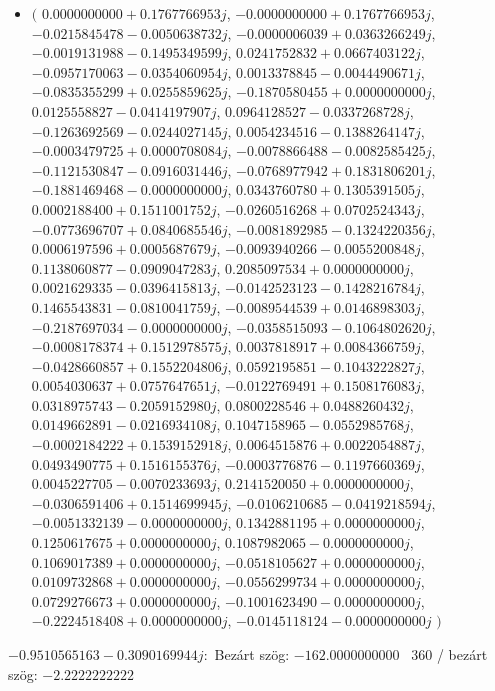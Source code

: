 \documentclass[14pt,a4paper]{article}
\begin{document}
\begin{itemize}
\item
$\big($
$0.0000000000+0.1767766953j$, $-0.0000000000+0.1767766953j$, $-0.0215845478-0.0050638732j$, $-0.0000006039+0.0363266249j$, $-0.0019131988-0.1495349599j$, $0.0241752832+0.0667403122j$, $-0.0957170063-0.0354060954j$, $0.0013378845-0.0044490671j$, $-0.0835355299+0.0255859625j$, $-0.1870580455+0.0000000000j$, $0.0125558827-0.0414197907j$, $0.0964128527-0.0337268728j$, $-0.1263692569-0.0244027145j$, $0.0054234516-0.1388264147j$, $-0.0003479725+0.0000708084j$, $-0.0078866488-0.0082585425j$, $-0.1121530847-0.0916031446j$, $-0.0768977942+0.1831806201j$, $-0.1881469468-0.0000000000j$, $0.0343760780+0.1305391505j$, $0.0002188400+0.1511001752j$, $-0.0260516268+0.0702524343j$, $-0.0773696707+0.0840685546j$, $-0.0081892985-0.1324220356j$, $0.0006197596+0.0005687679j$, $-0.0093940266-0.0055200848j$, $0.1138060877-0.0909047283j$, $0.2085097534+0.0000000000j$, $0.0021629335-0.0396415813j$, $-0.0142523123-0.1428216784j$, $0.1465543831-0.0810041759j$, $-0.0089544539+0.0146898303j$, $-0.2187697034-0.0000000000j$, $-0.0358515093-0.1064802620j$, $-0.0008178374+0.1512978575j$, $0.0037818917+0.0084366759j$, $-0.0428660857+0.1552204806j$, $0.0592195851-0.1043222827j$, $0.0054030637+0.0757647651j$, $-0.0122769491+0.1508176083j$, $0.0318975743-0.2059152980j$, $0.0800228546+0.0488260432j$, $0.0149662891-0.0216934108j$, $0.1047158965-0.0552985768j$, $-0.0002184222+0.1539152918j$, $0.0064515876+0.0022054887j$, $0.0493490775+0.1516155376j$, $-0.0003776876-0.1197660369j$, $0.0045227705-0.0070233693j$, $0.2141520050+0.0000000000j$, $-0.0306591406+0.1514699945j$, $-0.0106210685-0.0419218594j$, $-0.0051332139-0.0000000000j$, $0.1342881195+0.0000000000j$, $0.1250617675+0.0000000000j$, $0.1087982065-0.0000000000j$, $0.1069017389+0.0000000000j$, $-0.0518105627+0.0000000000j$, $0.0109732868+0.0000000000j$, $-0.0556299734+0.0000000000j$, $0.0729276673+0.0000000000j$, $-0.1001623490-0.0000000000j$, $-0.2224518408+0.0000000000j$, $-0.0145118124-0.0000000000j$
$\big)$
\end{itemize}
$-0.9510565163-0.3090169944j$:\
Bezárt szög: $-162.0000000000$ \
360 / bezárt szög: $-2.2222222222$\
\end{document}
